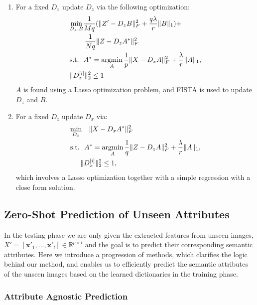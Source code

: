 \documentclass[letterpaper]{article} %
\def\x{\mathbf{x}}
\def\R{\mathbb{R}}
\begin{document}
\begin{enumerate}
\item For a fixed $D_x$ update $D_z$ via the following optimization:
\begin{eqnarray}
\begin{split}
&\underset{D_z,B}{\operatorname*{min}} \frac{1}{Mq}(\|Z'-D_zB\|^2_F+\frac{q\lambda}{r}\|B\|_1)+ \\&\hspace{.3in}\frac{1}{Nq}\|Z-D_zA^*\|_F^2\\& \text{s.t.}~~ A^*=\operatorname*{argmin}_{A} \frac{1}{p}\|X-D_xA\|^2_F+ \frac{\lambda}{r}\|A\|_1,\\& \|D_z^{[i]}\|_2^2\leq 1
 \end{split}
\label{eq:maineq1}
\end{eqnarray}
$A$ is found using a Lasso optimization problem, and FISTA \cite{beck2009fast} is used to update $D_z$ and $B$. 
\item For a fixed $D_z$ update $D_x$ via:
\begin{eqnarray}
\begin{split}
  &\underset{D_x}{\operatorname*{min}} ~~~ \|X-D_xA^*\|^2_F \\
 & \text{s.t.}~~ A^*=\operatorname*{argmin}_{A} \frac{1}{q}\|Z-D_zA\|_F^2+\frac{\lambda}{r} \|A\|_1,\\& \hspace{.2in}\|D_x^{[i]}\|_2^2\leq 1,
 \end{split}
\label{eq:maineq2}
\end{eqnarray}
which involves a Lasso optimization together with a simple regression with a close form solution. 
\end{enumerate}

\subsection{Zero-Shot Prediction of Unseen Attributes}

In the testing phase we are only given the extracted features from unseen images, $X'=[\x'_1,...,\x'_l]\in\R^{p\times l}$ and the goal is to predict their corresponding semantic attributes. Here we introduce a progression of methods, which clarifies the logic behind our method, and enables us to efficiently predict the semantic attributes of the unseen images based on the learned dictionaries in the training phase. 

\subsubsection{Attribute Agnostic Prediction}
\end{document}
